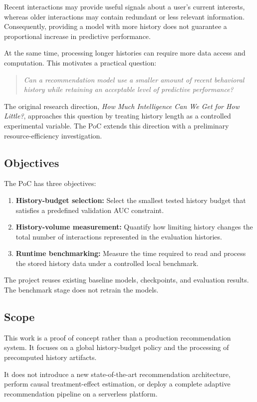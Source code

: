 \documentclass[11pt,a4paper]{article}
\begin{document}
Recent interactions may provide useful signals about a user's current interests, whereas older interactions may contain redundant or less relevant information. Consequently, providing a model with more history does not guarantee a proportional increase in predictive performance.

At the same time, processing longer histories can require more data access and computation. This motivates a practical question:
\begin{quote}
\emph{Can a recommendation model use a smaller amount of recent behavioral history while retaining an acceptable level of predictive performance?}
\end{quote}
The original research direction, \textit{How Much Intelligence Can We Get for How Little?}, approaches this question by treating history length as a controlled experimental variable. The PoC extends this direction with a preliminary resource-efficiency investigation.

\subsection{Objectives}
The PoC has three objectives:
\begin{enumerate}
    \item \textbf{History-budget selection:} Select the smallest tested history budget that satisfies a predefined validation AUC constraint.
    \item \textbf{History-volume measurement:} Quantify how limiting history changes the total number of interactions represented in the evaluation histories.
    \item \textbf{Runtime benchmarking:} Measure the time required to read and process the stored history data under a controlled local benchmark.
\end{enumerate}
The project reuses existing baseline models, checkpoints, and evaluation results. The benchmark stage does not retrain the models.

\subsection{Scope}
This work is a proof of concept rather than a production recommendation system. It focuses on a global history-budget policy and the processing of precomputed history artifacts.

It does not introduce a new state-of-the-art recommendation architecture, perform causal treatment-effect estimation, or deploy a complete adaptive recommendation pipeline on a serverless platform.
\end{document}
